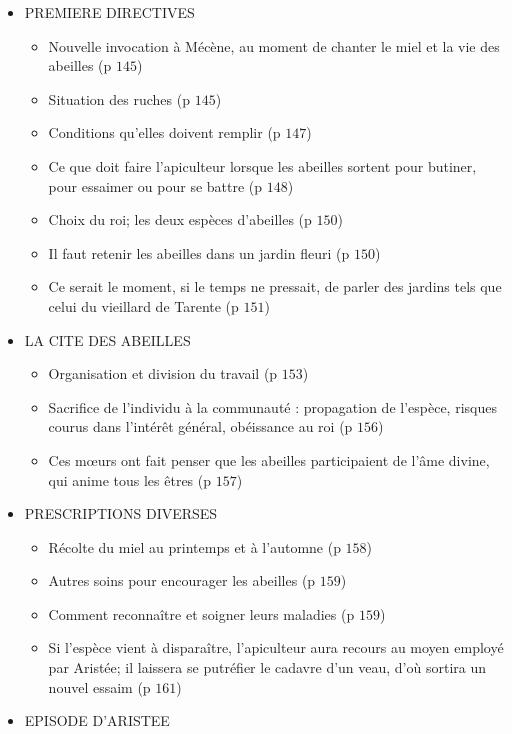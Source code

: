 \documentclass[a4paper, 11pt, hidelinks]{article}
\begin{document}
\begin{itemize}
    \item PREMIERE DIRECTIVES \begin{itemize} 
        \item Nouvelle invocation à Mécène, au moment de chanter le miel et la vie des abeilles (p $145$)
        \item Situation des ruches (p $145$)
        \item Conditions qu'elles doivent remplir (p $147$) 
        \item Ce que doit faire l'apiculteur lorsque les abeilles sortent pour butiner, pour essaimer ou pour se battre (p $148$)
        \item Choix du roi; les deux espèces d'abeilles (p $150$)
        \item Il faut retenir les abeilles dans un jardin fleuri  (p $150$)
        \item Ce serait le moment, si le temps ne pressait, de parler des jardins tels que celui du vieillard de Tarente (p $151$)
    \end{itemize}
    \item LA CITE DES ABEILLES \begin{itemize} 
        \item Organisation et division du travail (p $153$)
        \item Sacrifice de l'individu à la communauté : propagation de l'espèce, risques courus dans l'intérêt général, obéissance au roi (p $156$)
        \item Ces mœurs ont fait penser que les abeilles participaient de l'âme divine, qui anime tous les êtres (p $157$)
    \end{itemize}
    \item PRESCRIPTIONS DIVERSES \begin{itemize} 
        \item Récolte du miel au printemps et à l'automne (p $158$)
        \item Autres soins pour encourager les abeilles (p $159$)
        \item Comment reconnaître et soigner leurs maladies (p $159$)
        \item Si l'espèce vient à disparaître, l'apiculteur aura recours au moyen employé par Aristée; il laissera se putréfier le cadavre d'un veau, d'où sortira un nouvel essaim (p $161$)
    \end{itemize}
    \item EPISODE D'ARISTEE \begin{itemize} 

\end{itemize}
\end{itemize}
\end{document}
